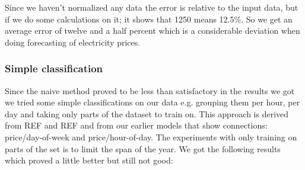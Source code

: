 \begin{table}[!ht]\footnotesize
\centering  %
\caption{Results from the naive training approach.} %
\label{table:naiveTrainingApproach} %
\end{table}

Since we haven't normalized any data the error is relative to the input data, but if we do some calculations on it; it shows that 1250 means 12.5\%. So we get an average error of twelve and a half percent which is a considerable deviation when doing forecasting of electricity prices. 
\subsubsection{Simple classification}
Since the naive method proved to be less than satisfactory in the results we got we tried some simple classifications on our data e.g. grouping them per hour, per day and taking only parts of the dataset to train on. This approach is derived from REF and REF and from our earlier models that show connections: price/day-of-week and price/hour-of-day. The experiments with only training on parts of the set is to limit the span of the year. We got the following results which proved a little better but still not good:

\begin{table}[!ht]
\centering  %
\caption{Results from the simple classification approach} %
\label{table:naiveTrainingApproach} %
\end{table}

